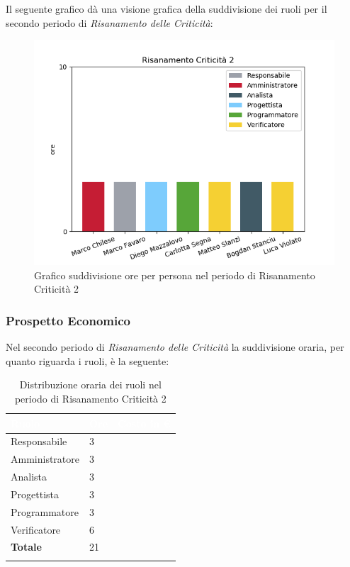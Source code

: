 Il seguente grafico dà una visione grafica della suddivisione dei ruoli per il secondo periodo di \textit{Risanamento delle Criticità}:\begin{figure}[H]
	\centering
  		\includegraphics[width=0.8\linewidth]{./images/fig_rc2.png}
  		\caption{Grafico suddivisione ore per persona nel periodo di Risanamento Criticità 2}
  		\label{fig:grafico suddivione ruoli rc2}
\end{figure}



\subsubsection{Prospetto Economico}
Nel secondo periodo di \textit{Risanamento delle Criticità} la suddivisione oraria, per quanto riguarda i ruoli, è la seguente: 


\begin{longtable}{| C{.30\textwidth}| C{.15\textwidth}| C{.20\textwidth}|}
\hline
{}\textbf{\textcolor{white}{Ruolo}} & \textbf{\textcolor{white}{Ore}} & \textbf{\textcolor{white}{Costo in \euro}} \\
\hline 
Responsabile & 3 &  \\
\hline
{}Amministratore & 3 &  \\
\hline
Analista & 3 &  \\
\hline
{}Progettista & 3 & \\
\hline
Programmatore & 3 &  \\
\hline 
{}Verificatore & 6 &  \\
\hline
\textbf{Totale} & 21 &  \\
\hline 

\caption{Distribuzione oraria dei ruoli nel periodo di Risanamento Criticità 2}
\label{Distribuzione oraria per ruoli rc2}
\end{longtable}

